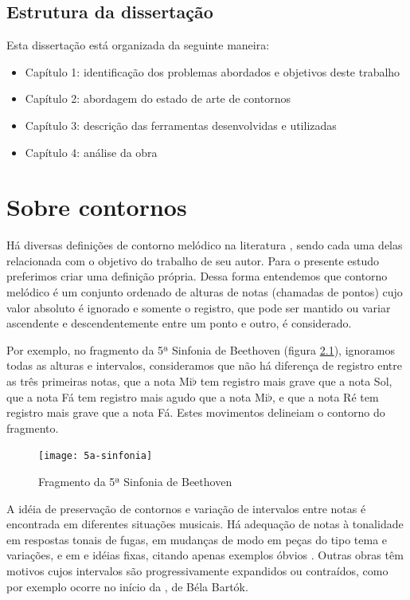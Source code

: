 \section{Estrutura da dissertação}
\label{sec:estr-da-diss}

Esta dissertação está organizada da seguinte maneira:

\begin{itemize}
\item Capítulo 1: identificação dos problemas abordados e objetivos
  deste trabalho
\item Capítulo 2: abordagem do estado de arte de contornos
\item Capítulo 3: descrição das ferramentas desenvolvidas e utilizadas
\item Capítulo 4: análise da obra \obra{}
\end{itemize}

\chapter{Sobre contornos}
\label{cha:sobre-contornos}

Há diversas definições de contorno melódico na literatura
\cite{piston59:harmony,toch77:shaping,schonberg:fundamentals,adams76:melodic,marvin.ea87:relating,morris87:composition,clifford95:contour,beard03:contour},
sendo cada uma delas relacionada com o objetivo do trabalho de seu
autor. Para o presente estudo preferimos criar uma definição
própria. Dessa forma entendemos que contorno melódico é um conjunto
ordenado de alturas de notas (chamadas de pontos) cujo valor absoluto
é ignorado e somente o registro, que pode ser mantido ou variar
ascendente e descendentemente entre um ponto e outro, é
considerado.

Por exemplo, no fragmento da 5ª Sinfonia de Beethoven (figura
\ref{fig:5a-sinfonia}), ignoramos todas as alturas e intervalos,
consideramos que não há diferença de registro entre as três primeiras
notas, que a nota Mi$\flat$ tem registro mais grave que a nota Sol,
que a nota Fá tem registro mais agudo que a nota Mi$\flat$, e que a
nota Ré tem registro mais grave que a nota Fá. Estes movimentos
delineiam o contorno do fragmento.

\begin{figure}
  \centering
  \texttt{[image: 5a-sinfonia]}
  \caption{Fragmento da 5ª Sinfonia de Beethoven}
  \label{fig:5a-sinfonia}
\end{figure}

A idéia de preservação de contornos e variação de intervalos entre
notas é encontrada em diferentes situações musicais. Há adequação de
notas à tonalidade em respostas tonais de fugas, em mudanças de modo
em peças do tipo tema e variações, e em  e idéias
fixas, citando apenas exemplos óbvios
\cite[p. 29]{morris87:composition}. Outras obras têm motivos cujos
intervalos são progressivamente expandidos ou contraídos, como por
exemplo ocorre no início da , de Béla Bartók.

